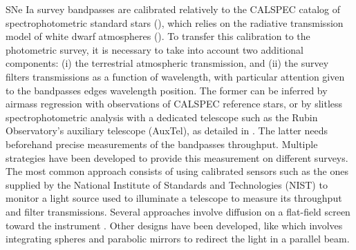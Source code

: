 SNe Ia survey bandpasses are calibrated relatively to the CALSPEC catalog of spectrophotometric standard stars (\cite{Bohlin_2020}), which relies on the radiative transmission model of white dwarf atmospheres (\cite{Narayan_2019}). To transfer this calibration to the photometric survey, it is necessary to take into account two additional components: (i) the terrestrial atmospheric transmission, and (ii) the survey filters transmissions as a function of wavelength, with particular attention given to the bandpasses edges wavelength position. The former can be inferred by airmass regression with observations of CALSPEC reference stars, or by slitless spectrophotometric analysis with a dedicated telescope such as the Rubin Observatory's auxiliary telescope (AuxTel), as detailed in \cite{Neveu_2024}. The latter needs beforehand precise measurements of the bandpasses throughput. Multiple strategies have been developed to provide this measurement on different surveys. The most common approach consists of using calibrated sensors such as the ones supplied by the National Institute of Standards and Technologies (NIST) \citep{houston2008detectors} to monitor a light source used to illuminate a telescope to measure its throughput and filter transmissions. Several approaches involve diffusion on a flat-field screen toward the instrument \citep{stubbs2006,marshall2013}. Other designs have been developed, like \cite{Lombardo_2017} which involves integrating spheres and parabolic mirrors to redirect the light in a parallel beam.


